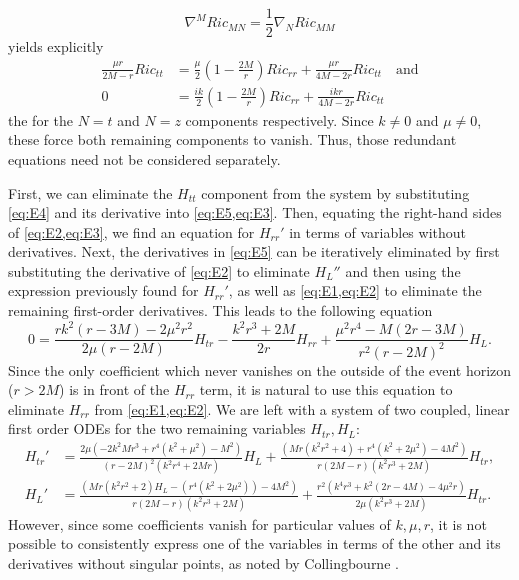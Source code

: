\documentclass[11pt,aip,jmp,amsmath,amssymb,draft]{revtex4-1}
\begin{document}
\begin{equation} \label{eq:contracted_Bianchi}
    \nabla^M Ric_{MN} = \frac{1}{2} \nabla_N Ric_{MM}
\end{equation}
yields explicitly
\begin{align}
    \frac{\mu r}{2M- r} Ric_{tt} &= \frac{\mu}{2} \left(1-\frac{2M}{r} \right) Ric_{rr} + \frac{\mu r }{4 M- 2r} Ric_{tt} \quad \text{and} \\
    0 &= \frac{i k}{2}  \left(1-\frac{2 M}{r}\right) Ric_{rr} + \frac{i k r}{4 M-2 r} Ric_{tt}
\end{align}
the for the $N=t$ and $N=z$ components respectively. Since $k \ne 0$ and $\mu \ne 0$, these force both remaining components to vanish.
Thus, those redundant equations need not be considered separately.

First, we can eliminate the $H_{tt}$ component from the system by substituting \cref{eq:E4} and its derivative into \cref{eq:E5,eq:E3}. 
Then, equating the right-hand sides of \cref{eq:E2,eq:E3}, we find an equation for $H_{rr}'$ in terms of variables without derivatives. 
Next, the derivatives in \cref{eq:E5} can be iteratively eliminated by first substituting the derivative of \cref{eq:E2} to eliminate $H_L''$ and then using the expression previously found for $H_{rr}'$, as well as \cref{eq:E1,eq:E2} to eliminate the remaining first-order derivatives.
This leads to the following equation
\begin{equation} \label{eq:E5Prime}
    0=\frac{rk^2 (r-3M)-2 \mu^2 r^2}{2\mu(r- 2M)}H_{tr} - \frac{k^2 r^3+2 M}{2 r}H_{rr}+\frac{\mu^2 r^4-M(2r-3M)}{r^2 (r-2 M)^2}H_L.
\end{equation}
Since the only coefficient which never vanishes on the outside of the event horizon ($r > 2M$) is in front of the $H_{rr}$ term, it is natural to use this equation to eliminate $H_{rr}$ from \cref{eq:E1,eq:E2}.
We are left with a system of two coupled, linear first order ODEs for the two remaining variables $H_{tr}, H_L$:
\begin{align}
    H_{tr}' &= \frac{2 \mu \left(-2 k^2 M r^3+r^4 \left(k^2+\mu^2\right)-M^2\right)}{(r-2 M)^2 \left(k^2 r^4+2 M r\right)}H_L +\frac{\left(M r \left(k^2 r^2+4\right)+r^4 \left(k^2+2 \mu^2\right)-4 M^2\right)}{r (2 M-r) \left(k^2 r^3+2 M\right)}H_{tr},  \\
    H_L' &= \frac{\left(M r \left(k^2 r^2+2\right)H_L -\left(r^4 \left(k^2+2 \mu^2\right)\right)-4 M^2\right)}{r (2 M-r) \left(k^2 r^3+2 M\right)}+\frac{r^2 \left(k^4 r^3+k^2 (2 r-4 M)-4 \mu^2 r\right)}{2 \mu \left(k^2 r^3+2 M\right)}H_{tr}.
\end{align} 
However, since some coefficients vanish for particular values of $k,\mu,r$, it is not possible to consistently express one of the variables in terms of the other and its derivatives without singular points, as noted by Collingbourne
\cite[Section~I.D]{collingbourne2021gregory}.
\end{document}
